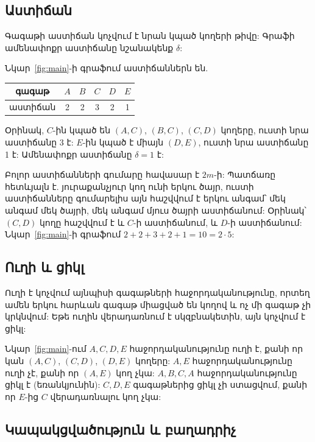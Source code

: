 \subsection{Աստիճան}

Գագաթի աստիճան կոչվում է նրան կպած կողերի թիվը: Գրաֆի ամենափոքր աստիճանը նշանակենք $\delta$:

\begin{example}
Նկար~\ref{fig:main}-ի գրաֆում աստիճաններն են.
\begin{center}
\begin{tabular}{c|ccccc}
գագաթ & $A$ & $B$ & $C$ & $D$ & $E$\\
\hline
աստիճան & 2 & 2 & 3 & 2 & 1\\
\end{tabular}
\end{center}
Օրինակ, $C$-ին կպած են $(A,C)$, $(B,C)$, $(C,D)$ կողերը, ուստի նրա աստիճանը 3 է: $E$-ին կպած է միայն $(D,E)$, ուստի նրա աստիճանը 1 է: Ամենափոքր աստիճանը $\delta=1$ է:
\end{example}

Բոլոր աստիճանների գումարը հավասար է $2m$-ի: Պատճառը հետևյալն է. յուրաքանչյուր կող ունի երկու ծայր, ուստի աստիճանները գումարելիս այն հաշվվում է երկու անգամ՝ մեկ անգամ մեկ ծայրի, մեկ անգամ մյուս ծայրի աստիճանում: Օրինակ՝ $(C,D)$ կողը հաշվվում է և $C$-ի աստիճանում, և $D$-ի աստիճանում: Նկար~\ref{fig:main}-ի գրաֆում $2+2+3+2+1=10=2\cdot5$:

\subsection{Ուղի և ցիկլ}

\begin{definition}
Ուղի է կոչվում այնպիսի գագաթների հաջորդականությունը, որտեղ ամեն երկու հարևան գագաթ միացված են կողով և ոչ մի գագաթ չի կրկնվում: Եթե ուղին վերադառնում է սկզբնակետին, այն կոչվում է ցիկլ:
\end{definition}

Նկար~\ref{fig:main}-ում $A,C,D,E$ հաջորդականությունը ուղի է, քանի որ կան $(A,C)$, $(C,D)$, $(D,E)$ կողերը: $A,E$ հաջորդականությունը ուղի չէ, քանի որ $(A,E)$ կող չկա: $A,B,C,A$ հաջորդականությունը ցիկլ է (եռանկյունին): $C,D,E$ գագաթներից ցիկլ չի ստացվում, քանի որ $E$-ից $C$ վերադառնալու կող չկա:

\subsection{Կապակցվածություն և բաղադրիչ}

